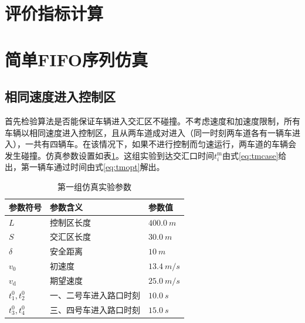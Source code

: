 \section{评价指标计算}
\paragraph{}

\section{简单FIFO序列仿真}
\subsection{相同速度进入控制区}
首先检验算法是否能保证车辆进入交汇区不碰撞。不考虑速度和加速度限制，所有车辆以相同速度进入控制区，且从两车道成对进入（同一时刻两车道各有一辆车进入），一共有四辆车。在该情况下，如果不进行控制而匀速运行，两车道的车辆会发生碰撞。仿真参数设置如表\ref{tab:case1:param}。这组实验到达交汇口时间$t_i^\mathrm{m}$由式\ref{eq:tmcase}给出，第一辆车通过时间由式\ref{eq:tmopt}解出。
\begin{table}[htbp]
\centering
\caption{第一组仿真实验参数}
\label{tab:case1:param}
\begin{tabular}{lll}
\toprule[1.5pt]
参数符号 & 参数含义 & 参数值 \\
\midrule[1pt]
$L$ & 控制区长度 & $\SI{400.0}{m}$ \\
$S$ & 交汇区长度 & $\SI{30.0}{m}$ \\
$\delta$ & 安全距离 & $\SI{10}{m}$ \\
$v_0$ & 初速度 & $\SI{13.4}{m\per s}$ \\
$v_\mathrm{d}$ & 期望速度 & $\SI{25.0}{m\per s}$ \\
$t_1^0, t_2^0$ & 一、二号车进入路口时刻 & $\SI{10.0}{s}$ \\
$t_3^0, t_4^0$ & 三、四号车进入路口时刻 & $\SI{15.0}{s}$ \\
\bottomrule[1.5pt]
\end{tabular}
\end{table}

